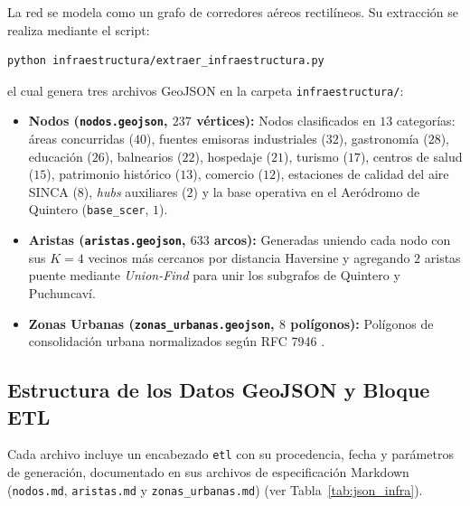 \documentclass[letterpaper,12pt]{article}
\begin{document}
La red se modela como un grafo de corredores aéreos rectilíneos. Su extracción se realiza mediante el script:
\begin{lstlisting}[language=bash]
python infraestructura/extraer_infraestructura.py
\end{lstlisting}
el cual genera tres archivos GeoJSON en la carpeta \texttt{infraestructura/}:
\begin{itemize}
    \item \textbf{Nodos (\texttt{nodos.geojson}, $237$ vértices):} Nodos clasificados en $13$ categorías: áreas concurridas ($40$), fuentes emisoras industriales ($32$), gastronomía ($28$), educación ($26$), balnearios ($22$), hospedaje ($21$), turismo ($17$), centros de salud ($15$), patrimonio histórico ($13$), comercio ($12$), estaciones de calidad del aire SINCA ($8$), \textit{hubs} auxiliares ($2$) y la base operativa en el Aeródromo de Quintero (\texttt{base\_scer}, $1$).
    \item \textbf{Aristas (\texttt{aristas.geojson}, $633$ arcos):} Generadas uniendo cada nodo con sus $K=4$ vecinos más cercanos por distancia Haversine y agregando $2$ aristas puente mediante \textit{Union-Find} para unir los subgrafos de Quintero y Puchuncaví.
    \item \textbf{Zonas Urbanas (\texttt{zonas\_urbanas.geojson}, $8$ polígonos):} Polígonos de consolidación urbana normalizados según RFC 7946 \cite{rfc7946}.
\end{itemize}

\subsection{Estructura de los Datos GeoJSON y Bloque ETL}
\label{subsec:infra_json}

Cada archivo incluye un encabezado \texttt{etl} con su procedencia, fecha y parámetros de generación, documentado en sus archivos de especificación Markdown (\texttt{nodos.md}, \texttt{aristas.md} y \texttt{zonas\_urbanas.md}) (ver Tabla~\ref{tab:json_infra}).
\end{document}
